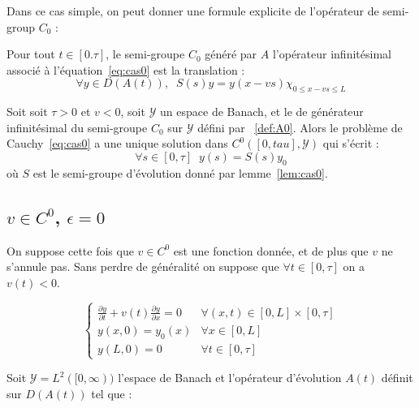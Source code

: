 \documentclass[a4paper]{article}
\begin{document}
Dans ce cas simple, on peut donner une formule explicite de l'opérateur de semi-group $C_0$ :

\begin{lemme}
	\label{lem:cas0}
	Pour tout $t\in[0.\tau]$, le semi-groupe $C_0$ généré par $A$ 
	l'opérateur infinitésimal associé à l'équation~\eqref{eq:cas0} est la translation :
	\[ \forall y \in D(A(t)), \; \; S(s)y = y(x - vs) \chi_{0\leq x-vs \leq L}\]
\end{lemme}

\begin{theoreme}
	Soit soit $\tau>0$ et $v<0$,
	soit $\mathscr{Y}$ un espace de Banach, et le  
	de générateur infinitésimal du semi-groupe $C_0$ sur $\mathscr{Y}$
	défini par ~\eqref{def:A0}.
	Alors le problème de Cauchy~\eqref{eq:cas0} a une unique solution dans $C^0([0,tau],\mathscr{Y})$ qui s'écrit :
	\[ \forall s\in[0,\tau] \; \; y(s) = S(s)y_0 \]
	où $S$ est le semi-groupe d'évolution donné par lemme~\ref{lem:cas0}.
\end{theoreme}



\vspace{1.0cm}
\subsection{$v \in C^0$, $\epsilon = 0$}


On suppose cette fois que $v \in C^0$ est une fonction donnée, et de plus que $v$ ne s'annule pas. 
Sans perdre de généralité on suppose que $\forall t \in [0,\tau]$ on a $v(t)<0$.

\begin{equation}
\label{eq:cas1}
\begin{cases}
 \displaystyle \frac{\partial y}{\partial t}
 + v(t) \frac{\partial y} {\partial x}  
 = 0  & \forall (x,t) \in [0,L] \times [0, \tau]\\
 y(x,0) = y_{0} (x) & \forall x \in [0,L]\\
 y(L,0) = 0 & \forall t \in [0,\tau]
\end{cases}
\end{equation}

Soit $\mathscr{Y} = L^2([0,\infty))$ l'espace de Banach et l'opérateur d'évolution $A(t)$ définit sur $D(A(t))$ tel que :
\end{document}
